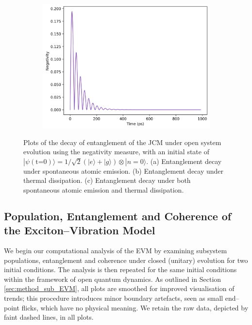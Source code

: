 \documentclass[11pt]{article}
\begin{document}
\begin{figure}[H]
    \begin{subfigure}{0.45\textwidth}
        \centering
        \includegraphics[width=0.85\linewidth]{Research Project/Code/results/JCM/OQS_Neg_Both_eg.png}
        \caption{}
        \label{fig:jcm_cqs_coh_eg}
    \end{subfigure}
    \hfill
    \caption{Plots of the decay of entanglement of the JCM under open system evolution using the negativity measure, with an initial state of $|\psi (\text{t=0})\rangle = 1/\sqrt{2}(|e\rangle + |g\rangle)\otimes|n=0\rangle$. (a) Entanglement decay under spontaneous atomic emission. (b) Entanglement decay under thermal dissipation. (c) Entanglement decay under both spontaneous atomic emission and thermal dissipation.}
\end{figure}

\subsection{Population, Entanglement and Coherence of the Exciton--Vibration Model}

We begin our computational analysis of the EVM by examining subsystem populations, entanglement and coherence under closed (unitary) evolution for two initial conditions. The analysis is then repeated for the same initial conditions within the framework of open quantum dynamics. As outlined in Section \ref{sec:method_sub_EVM}, all plots are smoothed for improved visualisation of trends; this procedure introduces minor boundary artefacts, seen as small end--point flicks, which have no physical meaning. We retain the raw data, depicted by faint dashed lines, in all plots.
\end{document}
